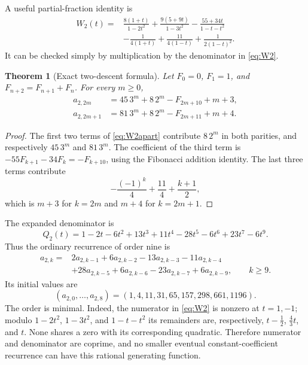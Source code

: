 \documentclass[11pt,letterpaper]{article}
\numberwithin{equation}{section}
\newtheorem{theorem}{Theorem}[section]
\theoremstyle{definition}
\theoremstyle{remark}
\begin{document}
A useful partial-fraction identity is
\begin{equation}\label{eq:W2apart}
\begin{split}
 W_2(t)={}&\frac{8(1+t)}{1-2t^2}
       +\frac{9(5+9t)}{1-3t^2}
       -\frac{55+34t}{1-t-t^2}\\
       &-\frac{1}{4(1+t)}+\frac{11}{4(1-t)}
        +\frac{1}{2(1-t)^2}.
\end{split}
\end{equation}
It can be checked simply by multiplication by the denominator in
\eqref{eq:W2}.

\begin{theorem}[Exact two-descent formula]\label{thm:W2closed}
Let $F_0=0$, $F_1=1$, and $F_{n+2}=F_{n+1}+F_n$. For every $m\ge0$,
\begin{align}
 a_{2,2m}&=45\,3^m+8\,2^m-F_{2m+10}+m+3,\label{eq:even}\\
 a_{2,2m+1}&=81\,3^m+8\,2^m-F_{2m+11}+m+4.\label{eq:odd}
\end{align}
\end{theorem}
\begin{proof}
The first two terms of \eqref{eq:W2apart} contribute $8\,2^m$ in both
parities, and respectively $45\,3^m$ and $81\,3^m$.
The coefficient of the third term is
$-55F_{k+1}-34F_k=-F_{k+10}$, using the Fibonacci addition identity.
The last three terms contribute
\[
 -\frac{(-1)^k}{4}+\frac{11}{4}+\frac{k+1}{2},
\]
which is $m+3$ for $k=2m$ and $m+4$ for $k=2m+1$.
\end{proof}

The expanded denominator is
\[
 Q_2(t)=1-2t-6t^2+13t^3+11t^4-28t^5-6t^6+23t^7-6t^9.
\]
Thus the ordinary recurrence of order nine is
\begin{equation}\label{eq:W2recurrence}
\begin{split}
 a_{2,k}={}&2a_{2,k-1}+6a_{2,k-2}-13a_{2,k-3}-11a_{2,k-4}\\
 &+28a_{2,k-5}+6a_{2,k-6}-23a_{2,k-7}+6a_{2,k-9},
 \qquad k\ge9.
\end{split}
\end{equation}
Its initial values are
\[
 (a_{2,0},\ldots,a_{2,8})=(1,4,11,31,65,157,298,661,1196).
\]
The order is minimal. Indeed, the numerator in \eqref{eq:W2} is nonzero
at $t=1,-1$; modulo $1-2t^2$, $1-3t^2$, and $1-t-t^2$ its remainders are,
respectively, $t-\tfrac12$, $\tfrac43t$, and $t$.
None shares a zero with its corresponding quadratic. Therefore numerator
and denominator are coprime, and no smaller eventual constant-coefficient
recurrence can have this rational generating function.
\end{document}
